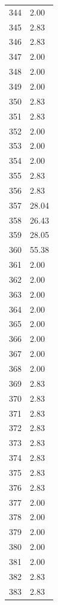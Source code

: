 \documentclass[a4paper,11pt]{article}
\begin{document}
\begin{center}
\begin{longtable}{|R{1.5cm}|R{2.5cm}|}
  344  &         2.00 \\ 
  345  &         2.83 \\ 
  346  &         2.83 \\ 
  347  &         2.00 \\ 
  348  &         2.00 \\ 
  349  &         2.00 \\ 
  350  &         2.83 \\ 
  351  &         2.83 \\ 
  352  &         2.00 \\ 
  353  &         2.00 \\ 
  354  &         2.00 \\ 
  355  &         2.83 \\ 
  356  &         2.83 \\ 
  357  &        28.04 \\ 
  358  &        26.43 \\ 
  359  &        28.05 \\ 
  360  &        55.38 \\ 
  361  &         2.00 \\ 
  362  &         2.00 \\ 
  363  &         2.00 \\ 
  364  &         2.00 \\ 
  365  &         2.00 \\ 
  366  &         2.00 \\ 
  367  &         2.00 \\ 
  368  &         2.00 \\ 
  369  &         2.83 \\ 
  370  &         2.83 \\ 
  371  &         2.83 \\ 
  372  &         2.83 \\ 
  373  &         2.83 \\ 
  374  &         2.83 \\ 
  375  &         2.83 \\ 
  376  &         2.83 \\ 
  377  &         2.00 \\ 
  378  &         2.00 \\ 
  379  &         2.00 \\ 
  380  &         2.00 \\ 
  381  &         2.00 \\ 
  382  &         2.83 \\ 
  383  &         2.83 \\ 

\end{longtable}
\end{center}
\end{document}
